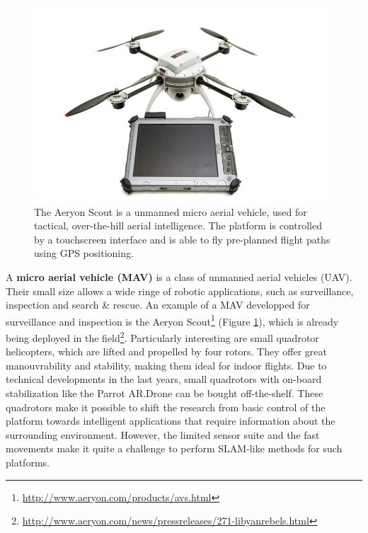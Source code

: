 \begin{figure}[htb]
\centering
\includegraphics[width=11.0cm]{images/aeryon-scout-tablet.jpg}
\caption{The Aeryon Scout is a unmanned micro aerial vehicle, used for tactical, over-the-hill aerial intelligence. The platform is controlled by a touchscreen interface and is able to fly pre-planned flight paths using GPS positioning.}
\label{fig:introduction_aeryon_scout}
\end{figure}

A \textbf{micro aerial vehicle (MAV)} is a class of unmanned aerial vehicles (UAV).
Their small size allows a wide ringe of robotic applications, such as surveillance, inspection and search \& rescue.
An example of a MAV developped for surveillance and inspection is the Aeryon Scout\footnote{\url{http://www.aeryon.com/products/avs.html}} (Figure \ref{fig:introduction_aeryon_scout}), which is already being deployed in the field\footnote{\url{http://www.aeryon.com/news/pressreleases/271-libyanrebels.html}}.
Particularly interesting are small quadrotor helicopters, which are lifted and propelled by four rotors.
They offer great manouvrability and stability, making them ideal for indoor flights.
Due to technical developments in the last years, small quadrotors with on-board stabilization like the Parrot AR.Drone can be bought off-the-shelf.
These quadrotors make it possible to shift the research from basic control of the platform towards intelligent applications that require information about the surrounding environment.
However, the limited sensor suite and the fast movements make it quite a challenge to perform SLAM-like methods for such platforms.



